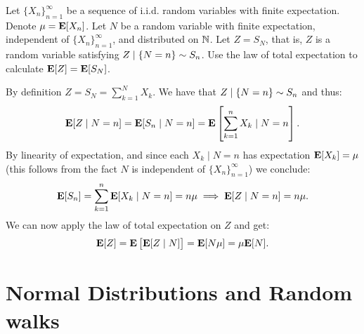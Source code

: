 \documentclass[11pt,a4paper]{article}
\begin{document}
\begin{exercise}
  Let $\{X_n\}_{n=1}^{\infty}$ be a sequence of i.i.d. random variables
  with finite expectation.
  Denote $\mu = \mathbf{E}[X_n]$.
  Let $N$ be a random variable with finite expectation,
  independent of $\{X_n\}_{n=1}^{\infty}$,
  and distributed on $\mathbb{N}$.
  Let $Z = S_N$,
  that is, $Z$ is a random variable satisfying $Z \mid \left\{N = n\right\} \sim S_n$.
  Use the law of total expectation to calculate $\mathbf{E}[Z] = \mathbf{E}[S_N]$.
\end{exercise}
\begin{solution}
  By definition $Z = S_N = \sum_{k=1}^{N} X_k$. 
  We have that $Z \mid \left\{N = n\right\} \sim S_n$ and thus:
  \[
    \mathbf{E}[Z \mid N = n] =
    \mathbf{E}[S_n \mid N = n] =
    \mathbf{E}\left[\sum_{k=1}^{n} X_k \mid N = n\right].
  \]
  By linearity of expectation, and since each $X_k \mid N = n$
  has expectation $\mathbf{E}[X_k] = \mu$ (this follows from the fact $N$ is independent
  of $\{X_n\}_{n=1}^{\infty}$)
  we conclude:
  \[
    \mathbf{E}[S_n] =
    \sum_{k=1}^{n} \mathbf{E}[X_k \mid N = n] = n\mu \implies
    \mathbf{E}[Z \mid N = n] = n \mu.
  \]
  We can now apply the law of total expectation on $Z$ and get:
  \[
    \mathbf{E}[Z] =
    \mathbf{E}\left[\mathbf{E}[Z \mid N]\right] =
    \mathbf{E}[N\mu] =
    \mu \mathbf{E}[N].
  \]
\end{solution}

\newpage

\section{Normal Distributions and Random walks}
\end{document}
